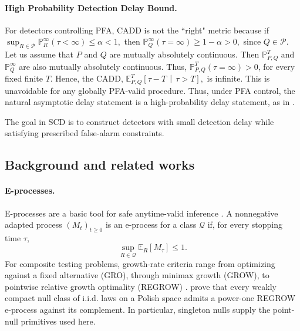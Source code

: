 \documentclass[12pt]{article}
\theoremstyle{spaced}
\theoremstyle{remark}
\newcommand{\E}{\mathbb E}
\newcommand{\bbP}{\mathbb P}
\begin{document}
\paragraph{High Probability Detection Delay Bound.}
For detectors controlling PFA, CADD is not the ``right" metric because if
$\sup_{R\in\mathcal{P}}\bbP_R^\infty(\tau<\infty)\le \alpha<1,$
then $\bbP_Q^\infty(\tau=\infty)\geq 1-\alpha>0,$ since $Q\in\mathcal{P}$.
Let us assume that $P$ and $Q$ are mutually absolutely continuous. Then $\bbP^T_{P,Q}$ and $\bbP^\infty_{Q}$ are also mutually absolutely continuous. Thus, $\bbP^T_{P,Q}(\tau=\infty)>0$, for every fixed finite $T$.  Hence, the CADD, $
\mathbb E_{P,Q}^{T}
\left[
\tau-T
\,\middle|\,
\tau>T
\right],$
is infinite.  This is unavoidable for any globally PFA-valid procedure.
Thus, under PFA control, the natural asymptotic delay statement is a high-probability delay statement, as in .



The goal in SCD is to construct detectors with small detection delay while satisfying prescribed false-alarm constraints.

\subsection{Background and related works}
\label{subsec:background}
\paragraph{E-processes.}
E-processes are a basic tool for safe anytime-valid inference
\citep{ramdas2022game,ramdas2024hypothesis}.  A nonnegative adapted process
$(M_t)_{t\ge0}$ is an e-process for a class $\mathcal Q$ if, for every stopping
time $\tau$,
\[
  \sup_{R\in\mathcal Q}\E_R[M_\tau]\le1.
\]
For composite testing problems, growth-rate criteria range from optimizing
against a fixed alternative (GRO), through minimax growth (GROW), to
pointwise relative growth optimality (REGROW) \citep{grunwald2024safe}.
\citet{ram2026power} prove that every weakly compact null class of i.i.d. laws
on a Polish space admits a power-one REGROW e-process against its complement.
In particular, singleton nulls supply the point-null primitives used here.
\end{document}
